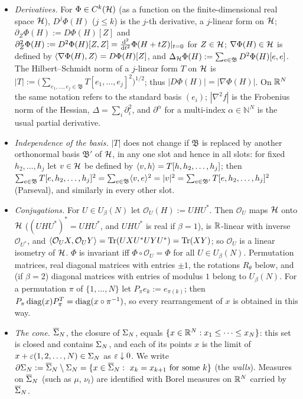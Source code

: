 \begin{itemize}[leftmargin=1.6em,itemsep=1pt]
\item \emph{Derivatives.} For $\Phi\in C^k(\mathcal{H})$ (as a function on the finite-dimensional real space $\mathcal{H}$), $D^j\Phi(H)$ ($j\le k$) is the $j$-th derivative, a $j$-linear form on $\mathcal{H}$;
$\partial_Z\Phi(H):=D\Phi(H)[Z]$ and $\partial_Z^2\Phi(H):=D^2\Phi(H)[Z,Z]=\frac{\mathrm{d}^2}{\mathrm{d} t^2}\Phi(H+tZ)|_{t=0}$ for $Z\in\mathcal{H}$; $\nabla\Phi(H)\in\mathcal{H}$ is defined by $\langle\nabla\Phi(H),Z\rangle=D\Phi(H)[Z]$, and $\Delta_{\mathcal{H}}\Phi(H):=\sum_{e\in\mathfrak B}D^2\Phi(H)[e,e]$.
The Hilbert--Schmidt norm of a $j$-linear form $T$ on $\mathcal{H}$ is $|T|:=\big(\sum_{e_1,\dots,e_j\in\mathfrak B}T[e_1,\dots,e_j]^2\big)^{1/2}$; thus $|D\Phi(H)|=|\nabla\Phi(H)|$.
On $\mathbb{R}^N$ the same notation refers to the standard basis $(e_i)$; $|\nabla^2f|$ is the Frobenius norm of the Hessian, $\Delta=\sum_i\partial_i^2$, and $\partial^\alpha$ for a multi-index $\alpha\in\mathbb N^N$ is the usual partial derivative.
\item \emph{Independence of the basis.} $|T|$ does not change if $\mathfrak B$ is replaced by another orthonormal basis $\mathfrak B'$ of $\mathcal{H}$, in any one slot and hence in all slots:
for fixed $h_2,\dots,h_j$ let $v\in\mathcal{H}$ be defined by $\langle v,h\rangle=T[h,h_2,\dots,h_j]$; then $\sum_{e\in\mathfrak B}T[e,h_2,\dots,h_j]^2=\sum_{e\in\mathfrak B}\langle v,e\rangle^2=|v|^2=\sum_{e\in\mathfrak B'}T[e,h_2,\dots,h_j]^2$ (Parseval), and similarly in every other slot.
\item \emph{Conjugations.} For $U\in U_\beta(N)$ let $\mathcal O_U(H):=UHU^*$. Then $\mathcal O_U$ maps $\mathcal{H}$ onto $\mathcal{H}$ ($(UHU^*)^*=UHU^*$, and $UHU^*$ is real if $\beta=1$), is $\mathbb{R}$-linear with inverse $\mathcal O_{U^*}$, and
$\langle\mathcal O_UX,\mathcal O_UY\rangle=\operatorname{Tr}(UXU^*UYU^*)=\operatorname{Tr}(XY)$; so $\mathcal O_U$ is a linear isometry of $\mathcal{H}$. $\Phi$ is invariant iff $\Phi\circ\mathcal O_U=\Phi$ for all $U\in U_\beta(N)$.
Permutation matrices, real diagonal matrices with entries $\pm1$, the rotations $R_\theta$ below, and (if $\beta=2$) diagonal matrices with entries of modulus $1$ belong to $U_\beta(N)$.
For a permutation $\pi$ of $\{1,\dots,N\}$ let $P_\pi e_k:=e_{\pi(k)}$; then $P_\pi\operatorname{diag}(x)P_\pi^{T}=\operatorname{diag}(x\circ\pi^{-1})$, so every rearrangement of $x$ is obtained in this way.
\item \emph{The cone.} $\overline{\Sigma}_N$, the closure of $\Sigma_N$, equals $\{x\in\mathbb{R}^N:x_1\le\dots\le x_N\}$: this set is closed and contains $\Sigma_N$, and each of its points $x$ is the limit of $x+\varepsilon(1,2,\dots,N)\in\Sigma_N$ as $\varepsilon\downarrow0$.
We write $\partial\Sig:=\cSig\setminus\Sig=\{x\in\cSig:\ x_k=x_{k+1}\text{ for some }k\}$ (the \emph{walls}). Measures on $\overline{\Sigma}_N$ (such as $\mu$, $\nu_t$) are identified with Borel measures on $\mathbb{R}^N$ carried by $\overline{\Sigma}_N$.
\end{itemize}

